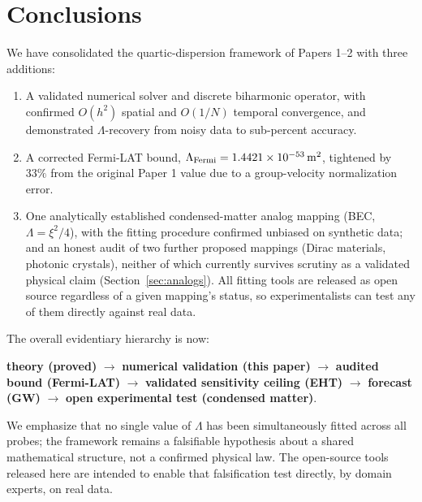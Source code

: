 \documentclass[12pt,a4paper]{article}
\begin{document}
\section{Conclusions}

We have consolidated the quartic-dispersion framework of Papers 1--2
with three additions:

\begin{enumerate}
  \item A validated numerical solver and discrete biharmonic operator,
    with confirmed $O(h^2)$ spatial and $O(1/N)$ temporal convergence,
    and demonstrated $\Lambda$-recovery from noisy data to sub-percent
    accuracy.
  \item A corrected Fermi-LAT bound,
    $\Lambda_{\rm Fermi}=1.4421\times10^{-53}\,{\rm m^2}$, tightened by
    $33\%$ from the original Paper 1 value due to a group-velocity
    normalization error.
  \item One analytically established condensed-matter analog mapping
    (BEC, $\Lambda=\xi^2/4$), with the fitting procedure confirmed
    unbiased on synthetic data; and an honest audit of two further
    proposed mappings (Dirac materials, photonic crystals), neither of
    which currently survives scrutiny as a validated physical claim
    (Section~\ref{sec:analogs}). All fitting tools are released as
    open source regardless of a given mapping's status, so
    experimentalists can test any of them directly against real data.
\end{enumerate}

The overall evidentiary hierarchy is now:
\begin{center}
\textbf{theory (proved)} $\to$ \textbf{numerical validation (this
paper)} $\to$ \textbf{audited bound (Fermi-LAT)} $\to$ \textbf{validated
sensitivity ceiling (EHT)} $\to$ \textbf{forecast (GW)} $\to$
\textbf{open experimental test (condensed matter)}.
\end{center}

We emphasize that no single value of $\Lambda$ has been simultaneously
fitted across all probes; the framework remains a falsifiable hypothesis
about a shared mathematical structure, not a confirmed physical law. The
open-source tools released here are intended to enable that falsification
test directly, by domain experts, on real data.
\end{document}
